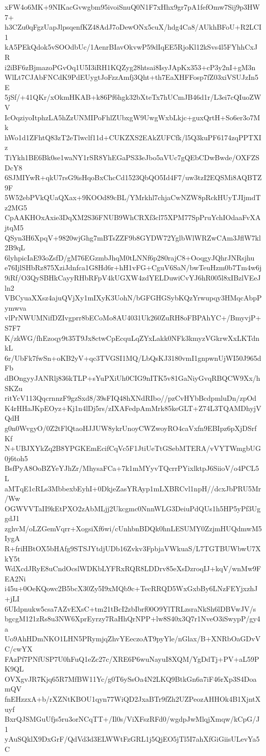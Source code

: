 xFW4o6MK+9NIKacGvwgbm95ivoiSnuQ0N1F7xHhx9gr7pA1fefOmw7Sij9p3HW7+
h3CZu0qFgzUapJlpsqenfKZ48AdJ7oDewONx5cuX/hdg4Ca8/AUkhBFoU+R2LCI1
kA5PEkQdok5vSOOdbUc/1AenrBIavOkvwP59dIqEE5RjoKl12kSvs4l5FYhhCxJR
i2iBF6zBjmazoPGvOq1U5I3iRH1KQZyg28htsai8IsyJApKx353+cP3y2nI+gM3n
WlLt7CJAbFNCdK9PdEUygtJoFzzAmfj3Qht+th7EaXHFFosp7fZ03xiVSUJzIn5E
5jSf/+41QKr/xOkmHKAB+k86Pf6hgk32bXteTx7hUCmJB46d1r/L3ei7cQIuoZWV
IcOqziyoItphzLA5hZzUNMIPoFhlZUbxgW9UwgWxbLkjc+guxQrtH+So6er3o7Mk
hWo1d1ZFhtQ83zT2eTlwclf11d+CUKZXS2EAkZUFCfk/l5Q3kuPF6174zqPPTXIz
TiYkh1BE6Bk0se1waNY1rSR8YhEGaPS33eJbo5aVUc7gQEbCDwBwde/OXFZSDcY8
6SJMIYwR+qkU7rsG9isHqoBxChcCd1523QbQO5Id4F7/uw3tzI2EQSMi8AQBTZ9F
5W52ebPVkQUaQXax+9KOOd89cBL/YMrkhl7chjaCwNZW8pRckHUyTJIjmdTz2MG5
CpAAKHOxAxie3DqXM2S36FNUB9WhCRXf3cl75XPM77SpPruYchIOdaaFvXAjtqM5
QSyn3H6XpqV+9820wjGhg7mBTsZZF9b8GYDW72YglbWlWRZwCAm3JflW7kl2B9qL
6lyhpicIaE93oZsfD/gM76EGzmbJhqM0tLNNf6p280rajC8+OoqgyJQhrJNRsjhu
e76IjlSHbRz875XziJdnfca1G8Hd6r+hH1vFG+CguV6SaN/bwTeuHzm0b7Tm4w6j
9iRf/O3QySBHkCayyRHbRFpV4kUGXW4zdYELDuwiCvYJ6hR005l8xIBzlVEeJln2
VBCyuaXXsz4ajuQVjXy1mIXyK3UohN/bGFGHGSybKQzYrwupqy3HMqcAbpPymwva
vlPrNWUMNifDZIvgprr8bECoMo8AU4031Uk260ZuRH8oFBPAhYC+/BmyvjP+S7F7
K/zkWG/fhEzoqy9t35T9Jx8ctwCpEcquLqZYxLakk0NFk3kmyzVGkrwXxLKTdnkL
6r/UbFk7fwSn+oKB2yV+qc3TVGSI1MQ/LbQsKJ3180vmI1gnpwnUjWI50J965dFb
dBOngyyJANRlj836kTLP+sYuPXiUh0CIG9nITK5v81GaNiyGvqRBQCW9Xx/hSKZu
ritYcV113QqcrnnzF9gzSxd8/39sFIQ48hXNdRIbo//pzCvHYbBcdpmluDn/zpOd
K4rHHaJKpEOyz+Kj1n4lDj5rs/zIXAFedpAmMrk85keGLT+Z74L3TQAMDhyjVQdH
g0n0WvgyO/0Z2tFlQtaoHJJUW8ykrUnoyCWZwoyRO4caVxfn9EBIpz6pXjDSrfKf
N+UBJXYkZq2B8YPGKEmEcifCqVc5F1JtiUeTtGSebMTERA/vVYTWmgbUG0j6toh5
BsfPyA8OoBZYeYJhZr/MhysaFCa+7k1mMYyvTQcrrPYixlktpJ6SiioV/o4PCL5L
aMTqE1cRLs3MbbexbEyhI+0DkjeZasYRAyp1mLXBRCvl1npH//dcxJbPRU5Mr/Ww
OGWVVTaII9kEtPXO2zAbMLjj2Ukcgmc0NnnWLG3DeiuPdQUs1h5HP5yPf3UggdJ1
zghvM/oLZGemVqrr+XogsiXf6wi/cUnhbnBDQk0hnLESUMY0ZzjmHUQdmwM5IygA
R+friHBtOX5bHAfg9STSJYtdjUDb16Zvkv3FpbjaVWkuaS/L7TGTBUWbwU7XkY5t
WdXcdJRyE8uCndOcslWDKbLYFRxRQR8LDDrv85eXsDzroqIJ+kqV/wnMw9FEA2Ni
i45u+0OeKQowc2B5bcX30Zy5I9xMQb9c+TecRRQD5WxGxbBy6LNzFEYjxzhJ+jLI
6UIdpnukw5csa7AZvEXsC+tm21tBcI2zbIbrf00O9YlTRLzsraNkSh6lDBVwJV/s
bgcgM121zRs8u3NW6XprEyrzy7RaHhQrNPP+lw8S40x3Q7r1NveO3iSwypP/gy4a
Uo9AhHDmNKO1LHN5PRymjqZhvYEeczoAT9pyYle/nGlax/B+XNRbOaGDvVC/cwYX
FAzPf7PNfUSP7U0hFuQ1eZc27c/XRE6P6wuNayuI8XQM/YgDdTj+PV+aL59PK9QL
OVXgvJR7Kjq65R7MfBW11Yc/g0T6ySsOa4N2LKQ9BtkGn6a7iF46rXp3S4DoamQV
fnEHzzxA+b/rXZNtKBOU1qyn77WiQD2JxaBTr9fZh2UZPeozAHHOk4B1XjntXuyf
BxrQJSMGuUfjs5ru3orNCqTT+/Il0s/ViXFszRFd0/wgdpJwMlqjXmqw/kCpG/J1
yAuSQklX9DxGrF/QdVd3d3ELWWtFzGRL1j5QjEO5jTl5I7ahXfGiGiisULevYa5C
